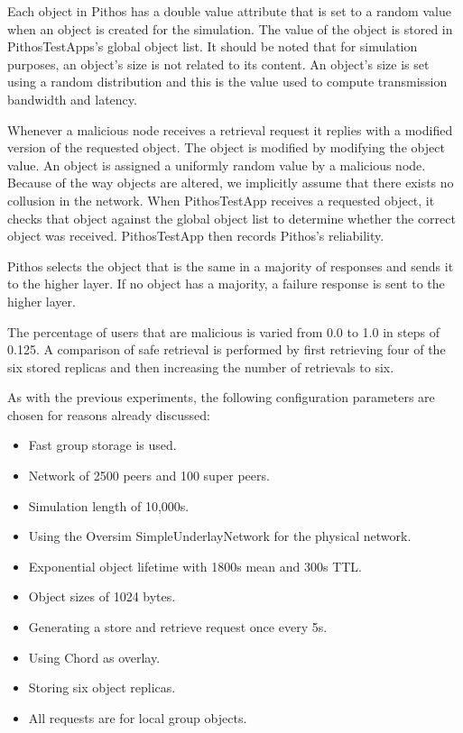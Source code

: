 Each object in Pithos has a double value attribute that is set to a random value when an object is created for the simulation. The value of the object is stored in PithosTestApps's global object list. It should be noted that for simulation purposes, an object's size is not related to its content. An object's size is set using a random distribution and this is the value used to compute transmission bandwidth and latency.

Whenever a malicious node receives a retrieval request it replies with a modified version of the requested object. The object is modified by modifying the object value. An object is assigned a uniformly random value by a malicious node. Because of the way objects are altered, we implicitly assume that there exists no collusion in the network. When PithosTestApp receives a requested object, it checks that object against the global object list to determine whether the correct object was received. PithosTestApp then records Pithos's reliability.

Pithos selects the object that is the same in a majority of responses and sends it to the higher layer. If no object has a majority, a failure response is sent to the higher layer.

The percentage of users that are malicious is varied from 0.0 to 1.0 in steps of 0.125. A comparison of safe retrieval is performed by first retrieving four of the six stored replicas and then increasing the number of retrievals to six.

As with the previous experiments, the following configuration parameters are chosen for reasons already discussed:
%
\begin{itemize}
\item Fast group storage is used.
\item Network of 2500 peers and 100 super peers.
\item Simulation length of 10,000s.
\item Using the Oversim SimpleUnderlayNetwork for the physical network.
\item Exponential object lifetime with 1800s mean and 300s TTL.
\item Object sizes of 1024 bytes.
\item Generating a store and retrieve request once every 5s.
\item Using Chord as overlay.
\item Storing six object replicas.
\item All requests are for local group objects.
\end{itemize}

